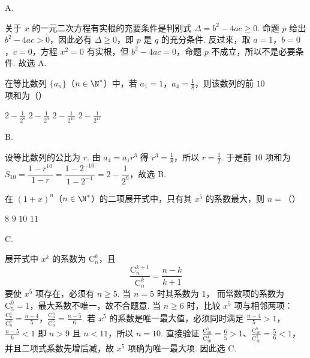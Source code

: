 \begin{answer}
A.
\end{answer}

\begin{solution}
关于 \(x\) 的一元二次方程有实根的充要条件是判别式 \(\Delta=b^{2}-4ac\geqslant0\). 命题 \(p\) 给出 \(b^{2}-4ac>0\)，因此必有 \(\Delta\geqslant0\)，即 \(p\) 是 \(q\) 的充分条件. 反过来，取 \(a=1\)，\(b=0\)，\(c=0\)，方程 \(x^{2}=0\) 有实根，但 \(b^{2}-4ac=0\)，命题 \(p\) 不成立，所以不是必要条件. 故选 A.
\end{solution}

\begin{problem}
在等比数列 \(\{a_{n}\}\)（\(n \in \N^{*}\)）中，若 \(a_{1} = 1\)，\(a_{4} = \frac{1}{8}\)，则该数列的前 \(10\) 项和为（\quad）

\choices
    {\(2 - \frac{1}{2^8}\)}
    {\(2 - \frac{1}{2^9}\)}
    {\(2 - \frac{1}{2^{10}}\)}
    {\(2 - \frac{1}{2^{11}}\)}
\end{problem}

\begin{answer}
B.
\end{answer}

\begin{solution}
设等比数列的公比为 \(r\). 由 \(a_{4}=a_{1}r^{3}\) 得 \(r^{3}=\frac18\)，所以 \(r=\frac12\). 于是前 \(10\) 项和为
\(S_{10}=\dfrac{1-r^{10}}{1-r}=\dfrac{1-2^{-10}}{1-2^{-1}}=2-\dfrac1{2^{9}}\)，故选 B.
\end{solution}

\begin{problem}
在 \((1 + x)^n\)（\(n \in \N^*\)）的二项展开式中，只有其 \(x^5\) 的系数最大，则 \(n =\)（\quad）

\choices
    {\(8\)}
    {\(9\)}
    {\(10\)}
    {\(11\)}
\end{problem}

\begin{answer}
C.
\end{answer}

\begin{solution}
展开式中 \(x^k\) 的系数为 \(\mathrm C_n^k\)，且
\[
\frac{\mathrm C_n^{k+1}}{\mathrm C_n^k}=\frac{n-k}{k+1}
\]
要使 \(x^5\) 项存在，必须有 \(n\geqslant5\). 当 \(n=5\) 时其系数为 \(1\)，
而常数项的系数为 \(\mathrm C_5^0=1\)，最大系数不唯一，故不合题意.
当 \(n\geqslant6\) 时，比较 \(x^5\) 项与相邻两项：
\(\frac{\mathrm C_n^5}{\mathrm C_n^4}=\frac{n-4}{5}\)，\(\frac{\mathrm C_n^6}{\mathrm C_n^5}=\frac{n-5}{6}\).
若 \(x^5\) 的系数是唯一最大值，必须同时满足
\(\frac{n-4}{5}>1\)，\(\frac{n-5}{6}<1\)
即 \(n>9\) 且 \(n<11\)，所以 \(n=10\). 直接验证
\(\frac{\mathrm C_{10}^5}{\mathrm C_{10}^4}=\frac{6}{5}>1\)、\(\frac{\mathrm C_{10}^6}{\mathrm C_{10}^5}=\frac{5}{6}<1\)，
并且二项式系数先增后减，故 \(x^5\) 项确为唯一最大项. 因此选 C.
\end{solution}

